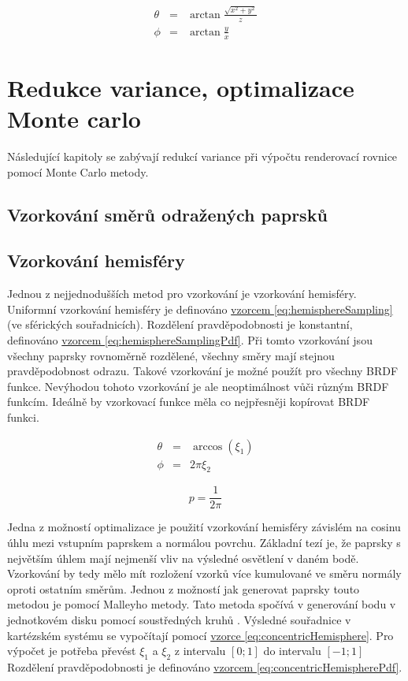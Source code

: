 \documentclass[czech,master]{diploma}
\newcommand{\interval}[1]{\left[{#1}\right]}
\newcommand{\randU}{\xi_{1}}
\newcommand{\randV}{\xi_{2}}
\begin{document}
\begin{eqnarray}
  \theta & = & \arctan \frac{\sqrt{x^2 + y^2}}{z} \nonumber \\
  \phi & = & \arctan \frac{y}{x}\label{eq:cartesianToSpherical}
\end{eqnarray}

\clearpage
\chapter{Redukce variance, optimalizace Monte carlo} \label{sec:reduction}
Následující kapitoly se zabývají redukcí variance při výpočtu renderovací rovnice pomocí Monte Carlo metody.

\section{Vzorkování směrů odražených paprsků}

\section{Vzorkování hemisféry} \label{sec:hemisphere}
Jednou z nejjednodušších metod pro vzorkování je vzorkování hemisféry. Uniformní vzorkování hemisféry je definováno \hyperref[eq:hemisphereSampling]{vzorcem \ref{eq:hemisphereSampling}} (ve sférických souřadnicích). Rozdělení pravděpodobnosti je konstantní, definováno \hyperref[eq:hemisphereSamplingPdf]{vzorcem \ref{eq:hemisphereSamplingPdf}}. Při tomto vzorkování jsou všechny paprsky rovnoměrně rozdělené, všechny směry mají stejnou pravděpodobnost odrazu. Takové vzorkování je možné použít pro všechny BRDF funkce. Nevýhodou tohoto vzorkování je ale neoptimálnost vůči různým BRDF funkcím. Ideálně by vzorkovací funkce měla co nejpřesněji kopírovat BRDF funkci. \par

\begin{eqnarray}
  \theta & = & \arccos(\randU) \nonumber \\
  \phi & = & 2\pi\randV \label{eq:hemisphereSampling}
\end{eqnarray}

\begin{equation} \label{eq:hemisphereSamplingPdf}
  p = \frac{1}{2\pi}
\end{equation}

Jedna z možností optimalizace je použití vzorkování hemisféry závislém na cosinu úhlu mezi vstupním paprskem a normálou povrchu. Základní tezí je, že paprsky s největším úhlem mají nejmenší vliv na výsledné osvětlení v daném bodě. Vzorkování by tedy mělo mít rozložení vzorků více kumulované ve směru normály oproti ostatním směrům. Jednou z možností jak generovat paprsky touto metodou je pomocí Malleyho metody. Tato metoda spočívá v generování bodu v jednotkovém disku pomocí soustředných kruhů \cite{PHARR2017747}. Výsledné souřadnice v kartézském systému se vypočítají pomocí \hyperref[eq:concentricHemisphere]{vzorce \ref{eq:concentricHemisphere}}. Pro výpočet je potřeba převést $\randU$ a $\randV$ z intervalu $\interval{0;1}$ do intervalu $\interval{-1;1}$  Rozdělení pravděpodobnosti je definováno \hyperref[eq:concentricHemisphere]{vzorcem \ref{eq:concentricHemispherePdf}}.
\end{document}
